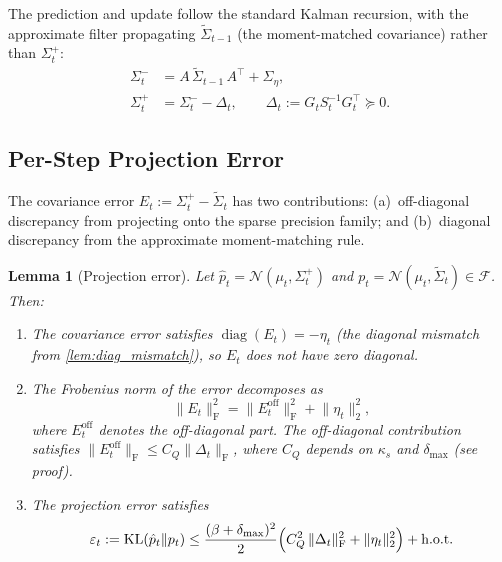 \documentclass{article}
\theoremstyle{plain}
\newtheorem{lemma}[theorem]{Lemma}
\theoremstyle{definition}
\theoremstyle{remark}
\DeclareMathOperator{\diag}{diag}
\DeclareMathOperator{\KL}{KL}
\newcommand{\F}{\mathcal{F}}
\newcommand{\norm}[1]{\lVert #1 \rVert}
\newcommand{\fnorm}[1]{\lVert #1 \rVert_{\mathrm{F}}}
\begin{document}
The prediction and update follow the standard Kalman recursion, with the approximate filter propagating $\widetilde{\Sigma}_{t-1}$ (the moment-matched covariance) rather than $\Sigma_t^+$:
\begin{align}
\Sigma_t^- &= A\,\widetilde{\Sigma}_{t-1}\,A^\top + \Sigma_\eta, \label{eq:predict}\\
\Sigma_t^+ &= \Sigma_t^- - \Delta_t, \qquad \Delta_t := G_t S_t^{-1} G_t^\top \succeq 0. \label{eq:update}
\end{align}

\subsection{Per-Step Projection Error}
\label{app:mm-perstep-projection}

The covariance error $E_t := \Sigma_t^+ - \widetilde{\Sigma}_t$ has two contributions: (a)~off-diagonal discrepancy from projecting onto the sparse precision family; and (b)~diagonal discrepancy from the approximate moment-matching rule.

\begin{lemma}[Projection error]
\label{lem:projection}
Let $\hat{p}_t = \mathcal{N}(\mu_t, \Sigma_t^+)$ and $p_t = \mathcal{N}(\mu_t, \widetilde{\Sigma}_t) \in \F$. Then:
\begin{enumerate}
\item[\textup{(a)}] The covariance error satisfies $\diag(E_t) = -\eta_t$ (the diagonal mismatch from \cref{lem:diag_mismatch}), so $E_t$ does \emph{not} have zero diagonal.
\item[\textup{(b)}] The Frobenius norm of the error decomposes as
\begin{equation}\label{eq:E_decomp}
\fnorm{E_t}^2 = \fnorm{E_t^{\mathrm{off}}}^2 + \norm{\eta_t}_2^2,
\end{equation}
where $E_t^{\mathrm{off}}$ denotes the off-diagonal part. The off-diagonal contribution satisfies $\fnorm{E_t^{\mathrm{off}}} \leq C_Q \fnorm{\Delta_t}$, where $C_Q$ depends on $\kappa_s$ and $\delta_{\max}$ (see proof).
\item[\textup{(c)}] The projection error satisfies
\begin{equation}\label{eq:proj_bound}
\varepsilon_t := \KL(\hat{p}_t \| p_t) \leq \frac{(\beta + \delta_{\max})^2}{2}\Bigl(C_Q^2\,\fnorm{\Delta_t}^2 + \norm{\eta_t}_2^2\Bigr) + \text{h.o.t.}
\end{equation}
\end{enumerate}
\end{lemma}
\end{document}
